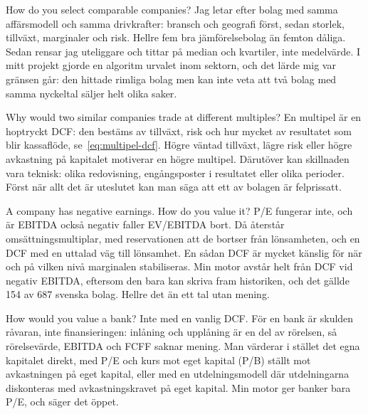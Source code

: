 \begin{fraga}{How do you select comparable companies?}
Jag letar efter bolag med samma affärsmodell och samma drivkrafter: bransch och geografi först,
sedan storlek, tillväxt, marginaler och risk. Hellre fem bra jämförelsebolag än femton
dåliga. Sedan rensar jag uteliggare och tittar på median och kvartiler, inte medelvärde. I mitt
projekt gjorde en algoritm urvalet inom sektorn, och det lärde mig var gränsen går: den
hittade rimliga bolag men kan inte veta att två bolag med samma nyckeltal säljer helt olika
saker.
\end{fraga}

\begin{fraga}{Why would two similar companies trade at different multiples?}
En multipel är en hoptryckt DCF: den bestäms av tillväxt, risk och hur mycket av resultatet som
blir kassaflöde, se~\eqref{eq:multipel-dcf}. Högre väntad tillväxt, lägre risk eller högre
avkastning på kapitalet motiverar en högre multipel. Därutöver kan skillnaden vara teknisk:
olika redovisning, engångsposter i resultatet eller olika perioder. Först när allt det är
uteslutet kan man säga att ett av bolagen är felprissatt.
\end{fraga}

\begin{fraga}{A company has negative earnings. How do you value it?}
P/E fungerar inte, och är EBITDA också negativ faller EV/EBITDA bort. Då återstår
omsättningsmultiplar, med reservationen att de bortser från lönsamheten, och en DCF med en
uttalad väg till lönsamhet. En sådan DCF är mycket känslig för när och på vilken nivå
marginalen stabiliseras. Min motor avstår helt från DCF vid negativ EBITDA, eftersom den bara
kan skriva fram historiken, och det gällde 154 av 687 svenska bolag. Hellre det än ett tal
utan mening.
\end{fraga}

\begin{fraga}{How would you value a bank?}
Inte med en vanlig DCF. För en bank är skulden råvaran, inte finansieringen: inlåning och
upplåning är en del av rörelsen, så rörelsevärde, EBITDA och FCFF saknar mening. Man värderar
i stället det egna kapitalet direkt, med P/E och kurs mot eget kapital (P/B) ställt mot
avkastningen på eget kapital, eller med en utdelningsmodell där utdelningarna diskonteras med
avkastningskravet på eget kapital. Min motor ger banker bara P/E, och säger det öppet.
\end{fraga}

